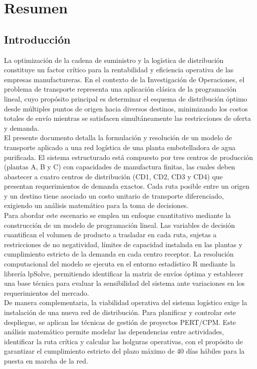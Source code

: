 \documentclass[12pt]{article}
\begin{document}
\newpage
\tableofcontents
\newpage

\section{Resumen}

\subsection{Introducción}
La optimización de la cadena de suministro y la logística de distribución constituye un factor crítico para la rentabilidad y eficiencia operativa de las empresas manufactureras. En el contexto de la Investigación de Operaciones, el problema de transporte representa una aplicación clásica de la programación lineal, cuyo propósito principal es determinar el esquema de distribución óptimo desde múltiples puntos de origen hacia diversos destinos, minimizando los costos totales de envío mientras se satisfacen simultáneamente las restricciones de oferta y demanda.\\

El presente documento detalla la formulación y resolución de un modelo de transporte aplicado a una red logística de una planta embotelladora de agua purificada. El sistema estructurado está compuesto por tres centros de producción (plantas A, B y C) con capacidades de manufactura finitas, las cuales deben abastecer a cuatro centros de distribución (CD1, CD2, CD3 y CD4) que presentan requerimientos de demanda exactos. Cada ruta posible entre un origen y un destino tiene asociado un costo unitario de transporte diferenciado, exigiendo un análisis matemático para la toma de decisiones.\\

Para abordar este escenario se emplea un enfoque cuantitativo mediante la construcción de un modelo de programación lineal. Las variables de decisión cuantifican el volumen de producto a trasladar en cada ruta, sujetas a restricciones de no negatividad, límites de capacidad instalada en las plantas y cumplimiento estricto de la demanda en cada centro receptor. La resolución computacional del modelo se ejecuta en el entorno estadístico R mediante la librería lpSolve, permitiendo identificar la matriz de envíos óptima y establecer una base técnica para evaluar la sensibilidad del sistema ante variaciones en los requerimientos del mercado.\\

De manera complementaria, la viabilidad operativa del sistema logístico exige la instalación de una nueva red de distribución. Para planificar y controlar este despliegue, se aplican las técnicas de gestión de proyectos PERT/CPM. Este análisis matemático permite modelar las dependencias entre actividades, identificar la ruta crítica y calcular las holguras operativas, con el propósito de garantizar el cumplimiento estricto del plazo máximo de 40 días hábiles para la puesta en marcha de la red.
\end{document}
